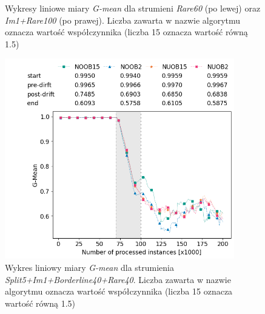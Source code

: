\begin{figure}[h]
    \centering
    \qquad
    \caption{Wykresy liniowe miary \textit{G-mean} dla strumieni \textit{Rare60} (po lewej) oraz \textit{Im1+Rare100} (po prawej). Liczba zawarta w nazwie algorytmu oznacza wartość współczynnika (liczba 15 oznacza wartość równą 1.5)}\label{Figure:PsiParametrization1}
\end{figure}

\newpage

\begin{figure}[h]
    \centering
    \includegraphics[width=10cm]{figures/split5im1borderline40rare40_psi.png}
    \caption{Wykres liniowy miary \textit{G-mean} dla strumienia \textit{Split5+Im1+Borderline40+Rare40}. Liczba zawarta w nazwie algorytmu oznacza wartość współczynnika (liczba 15 oznacza wartość równą 1.5)}\label{Figure:PsiParametrization2}
\end{figure}

